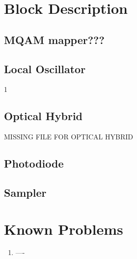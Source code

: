 \documentclass[a4paper]{article}
\begin{document}
\section{Block Description}

\subsection{MQAM mapper???}


\subsection{Local Oscillator}

1
\subsection{Optical Hybrid}
MISSING FILE FOR OPTICAL HYBRID\\
%

\subsection{Photodiode}


\subsection{Sampler}


\section{Known Problems}
\begin{enumerate}
    \item ----
\end{enumerate}


%
%
\end{document}

